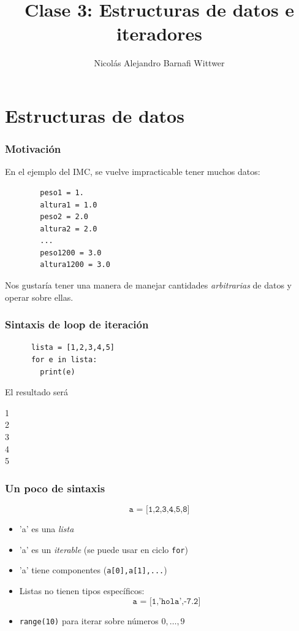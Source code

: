 \documentclass[14pt,aspectratio=169,xcolor=dvipsnames]{beamer}
\title[short title]{Clase 3: Estructuras de datos e iteradores}
\subtitle{}
\author[NA Barnafi] {Nicolás Alejandro Barnafi Wittwer}
\institute[UC|CMM] 
{
    Pontificia Universidad Católica de Chile \\
    Centro de Modelamiento Matemático
}
\date{}
\begin{document}
\begin{frame}
    \maketitle
\end{frame}
\section{Estructuras de datos}
\begin{frame}[fragile]\frametitle{Motivación}
En el ejemplo del IMC, se vuelve impracticable tener muchos datos:
    \begin{verbatim}
        peso1 = 1.
        altura1 = 1.0
        peso2 = 2.0 
        altura2 = 2.0
        ...
        peso1200 = 3.0
        altura1200 = 3.0
    \end{verbatim}

Nos gustaría tener una manera de manejar cantidades \emph{arbitrarias} de datos y operar sobre ellas.
\end{frame}
\begin{frame}[fragile]\frametitle{Sintaxis de loop de iteración}
    \begin{verbatim}
      lista = [1,2,3,4,5]
      for e in lista:
        print(e)
    \end{verbatim}
\pause El resultado será

1\\
2\\
3\\
4\\
5
\end{frame}
\begin{frame}\frametitle{Un poco de sintaxis}
    $$ \texttt{a = [1,2,3,4,5,8]} $$
    \begin{itemize}
        \item<+-> 'a' es una \emph{lista}
        \item<+-> 'a' es un \emph{iterable} (se puede usar en ciclo \texttt{for})
        \item<+-> 'a' tiene componentes (\texttt{a[0],a[1],...})
        \item<+-> Listas no tienen tipos específicos: 
            $$ \texttt{a = [1,'hola',-7.2]} $$
        \item<+-> \texttt{range(10)} para iterar sobre números $0,\dots,9$
    \end{itemize}
\end{frame}
\end{document}
